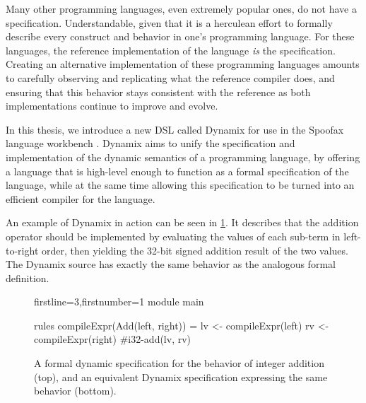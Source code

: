Many other programming languages, even extremely popular ones, do not have a specification. Understandable, given that it is a herculean effort to formally describe every construct and behavior in one's programming language. For these languages, the reference implementation of the language \textit{is} the specification. Creating an alternative implementation of these programming languages amounts to carefully observing and replicating what the reference compiler does, and ensuring that this behavior stays consistent with the reference as both implementations continue to improve and evolve.\\



In this thesis, we introduce a new \ac{DSL} called Dynamix for use in the Spoofax language workbench \cite{Spoofax2021}. Dynamix aims to unify the specification and implementation of the dynamic semantics of a programming language, by offering a language that is high-level enough to function as a formal specification of the language, while at the same time allowing this specification to be turned into an efficient compiler for the language.

An example of Dynamix in action can be seen in \cref{fig:dynamix_addition}. It describes that the addition operator should be implemented by evaluating the values of each sub-term in left-to-right order, then yielding the 32-bit signed addition result of the two values. The Dynamix source has exactly the same behavior as the analogous formal definition.

\begin{figure}
  \begin{prooftree}
  \end{prooftree}
  \begin{dynamix*}{firstline=3,firstnumber=1}
module main

rules
  compileExpr(Add(left, right)) = {
    lv <- compileExpr(left)
    rv <- compileExpr(right)
    #i32-add(lv, rv)
  }
  \end{dynamix*}
  \caption{A formal dynamic specification for the behavior of integer addition (top), and an equivalent Dynamix specification expressing the same behavior (bottom).}
  \label{fig:dynamix_addition}
\end{figure}

